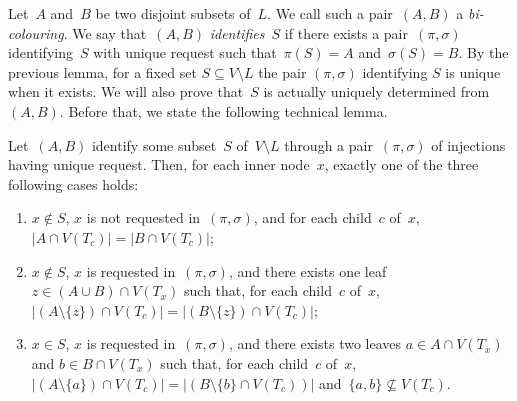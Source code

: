 \documentclass{lmcs} %
\newcommand{\card}[1]{\ensuremath{\left|#1\right|}}
\begin{document}
Let~$A$ and~$B$ be two disjoint subsets of~$L$.
We call such a pair~$(A, B)$ a \emph{bi-colouring}.
We say that~$(A,B)$ \emph{identifies~$S$}
if there exists a pair~$(\pi,\sigma)$ identifying~$S$ with unique request
such that~$\pi(S)=A$ and~$\sigma(S)=B$.
By the previous lemma, for a fixed set $S\subseteq V\setminus L$
the pair $(\pi,\sigma)$ identifying $S$ is unique when it exists.
We will also prove that~$S$ is actually uniquely determined from~$(A,B)$.
Before that, we state the following technical lemma.
\begin{lem}
    \label{lem:node cases in identification}
    Let~$(A,B)$ identify some subset~$S$ of~$V\setminus L$
    through a pair~$(\pi,\sigma)$ of injections having unique request.
    Then,
    for each inner node~$x$,
    exactly one of the three following cases holds:
    \begin{enumerate}
        \item
            $x\notin S$,
            $x$ is not requested in~$(\pi,\sigma)$,
            and for each child~$c$ of~$x$,
            $\card{A\cap V(T_c)}=\card{B\cap V(T_c)}$;
        \item
            $x\notin S$,
            $x$ is requested in~$(\pi,\sigma)$,
            and there exists one leaf~$z\in (A\cup B)\cap V(T_x)$
            such that, for each child~$c$ of~$x$,
            $\card{(A\setminus\{z\})\cap V(T_c)}=\card{(B\setminus\{z\})\cap V(T_c)}$;
        \item
            $x\in S$,
            $x$ is requested in~$(\pi,\sigma)$,
            and there exists two leaves
            $a\in A\cap V(T_x)$ and $b\in B\cap V(T_x)$
            such that, for each child~$c$ of~$x$,
            $\card{(A\setminus\{a\})\cap V(T_c)}=\card{(B\setminus\{b\}\cap V(T_c))}$
            and~$\{a,b\}\nsubseteq V(T_c)$.
    \end{enumerate}
\end{lem}
\end{document}
